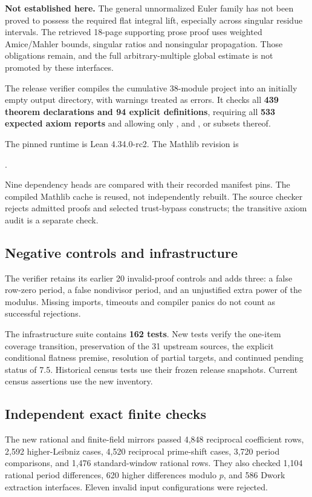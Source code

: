 \textbf{Not established here.} The general unnormalized Euler family has not been proved to possess the required flat integral lift, especially across singular residue intervals. The retrieved 18-page supporting prose proof uses weighted Amice/Mahler bounds, singular ratios and nonsingular propagation. Those obligations remain, and the full arbitrary-multiple global estimate is not promoted by these interfaces.

\par\medskip
{}
The release verifier compiles the cumulative 38-module project into an initially empty output directory, with warnings treated as errors. It checks all \textbf{439 theorem declarations and 94 explicit definitions}, requiring all \textbf{533 expected axiom reports} and allowing only ,  and , or subsets thereof.

The pinned runtime is Lean 4.34.0-rc2. The Mathlib revision is
\begin{center}\footnotesize{}.\end{center}
Nine dependency heads are compared with their recorded manifest pins. The compiled Mathlib cache is reused, not independently rebuilt. The source checker rejects admitted proofs and selected trust-bypass constructs; the transitive axiom audit is a separate check.

\subsection*{Negative controls and infrastructure}
The verifier retains its earlier 20 invalid-proof controls and adds three: a false row-zero period, a false nondivisor period, and an unjustified extra power of the modulus. Missing imports, timeouts and compiler panics do not count as successful rejections.

The infrastructure suite contains \textbf{162 tests}. New tests verify the one-item coverage transition, preservation of the 31 upstream sources, the explicit conditional flatness premise, resolution of partial targets, and continued pending status of 7.5. Historical census tests use their frozen release snapshots. Current census assertions use the new inventory.

\subsection*{Independent exact finite checks}
The new rational and finite-field mirrors passed 4,848 reciprocal coefficient rows, 2,592 higher-Leibniz cases, 4,520 reciprocal prime-shift cases, 3,720 period comparisons, and 1,476 standard-window rational rows. They also checked 1,104 rational period differences, 620 higher differences modulo $p$, and 586 Dwork extraction interfaces. Eleven invalid input configurations were rejected.

